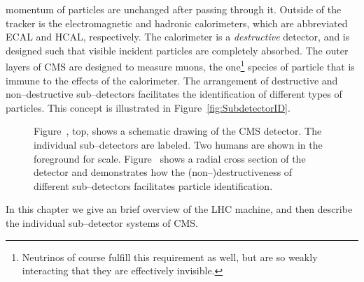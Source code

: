 momentum of particles are unchanged after passing through it.  Outside of the
tracker is the electromagnetic and hadronic calorimeters, which are abbreviated
ECAL and HCAL, respectively.  The calorimeter is a \emph{destructive} detector,
and is designed such that visible incident particles are completely absorbed.
The outer layers of CMS are designed to measure muons, the
one\footnote{Neutrinos of course fulfill this requirement as well, but are so
weakly interacting that they are effectively invisible.} species of particle
that is immune to the effects of the calorimeter.  The arrangement of
destructive and non--destructive sub--detectors facilitates the identification
of different types of particles.  This concept is illustrated in
Figure~\ref{fig:SubdetectorID}.
\begin{figure}
  \centering
  \caption[Schematic drawings of the CMS
  detector]{Figure~, top, shows a schematic drawing of the CMS
  detector.  The individual sub--detectors are labeled.  Two humans are shown in
  the foreground for scale. Figure~ shows a radial
  cross section of the detector and demonstrates how
  the (non--)destructiveness of different sub--detectors facilitates particle
  identification.} 
  \label{fig:AllCMSCutaways}
\end{figure}
In this chapter we give an brief overview of the LHC machine, and then describe
the individual sub--detector systems of CMS. 

